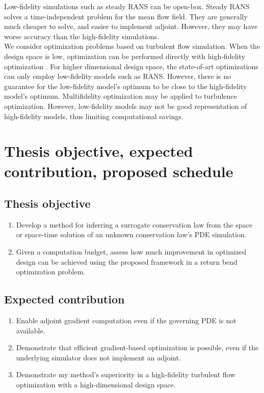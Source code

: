 \documentclass[a4paper,onecolumn]{article}
\theoremstyle{remark}
\begin{document}
\noindent Low-fidelity simulations such as steady RANS can be open-box. 
Steady RANS solves a time-independent problem for the mean flow field.
They are generally much cheaper to solve, and easier to implement adjoint. However,
they may have worse accuracy than the high-fidelity simulations.\\

\noindent We consider optimization problems based on turbulent flow simulation. 
When the design space is low, optimization can be performed directly with high-fidelity optimization
\cite{Chai opt}. For higher dimensional design space, the state-of-art optimizations can
only employ low-fidelity models such as RANS. However, there is no guarantee for
the low-fidelity model's optimum to be close to the high-fidelity model's optimum.
Multifidelity optimization may be applied to turbulence optimization. 
However, low-fidelity models may not be good representation of high-fidelity models, thus limiting computational savings. \\


\newpage
\section{Thesis objective, expected contribution, proposed schedule}

\subsection{Thesis objective}
\begin{enumerate}
    \item Develop a method for inferring a surrogate conservation law 
    from the space or space-time solution of an unknown conservation law's PDE simulation.
    \item Given a computation budget, assess how much improvement in optimized design
    can be achieved using the proposed framework in a return bend optimization problem.
\end{enumerate}

\subsection{Expected contribution}
\begin{enumerate}
    \item Enable adjoint gradient computation even if the governing PDE is not available.
    \item Demonstrate that efficient gradient-based optimization is possible, even if the underlying simulator does not implement
          an adjoint.
    \item Demonstrate my method's superiority in a high-fidelity turbulent flow optimization with a
    high-dimensional design space.
\end{enumerate}
\end{document}
